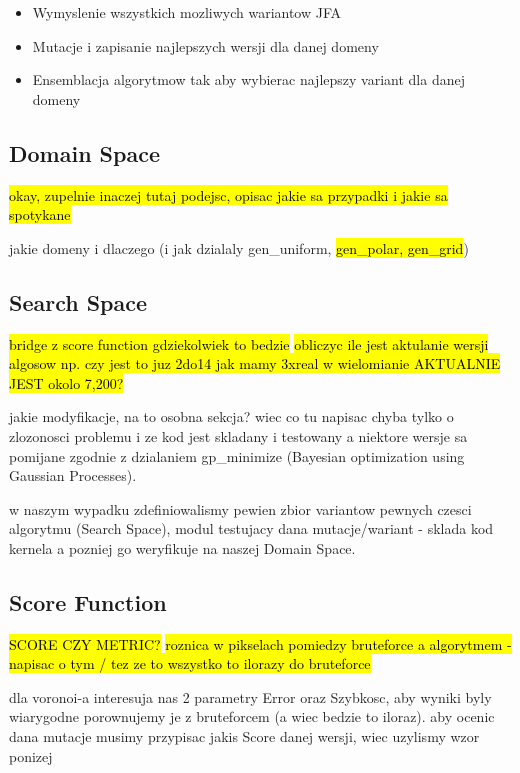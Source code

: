 \documentclass[format=acmsmall,screen,review,authordraft,nonacm]{acmart}
\begin{document}
\begin{itemize}
\item Wymyslenie wszystkich mozliwych wariantow JFA
\item Mutacje i zapisanie najlepszych wersji dla danej domeny
\item Ensemblacja algorytmow tak aby wybierac najlepszy variant dla danej domeny
\end{itemize}

\subsection{Domain Space} %

\hl{okay, zupelnie inaczej tutaj podejsc, opisac jakie sa przypadki i jakie sa
spotykane}

jakie domeny i dlaczego (i jak dzialaly gen\_uniform, \hl{gen\_polar, gen\_grid})

\subsection{Search Space} %

\hl{bridge z score function gdziekolwiek to bedzie}
\hl{obliczyc ile jest aktulanie wersji algosow np. czy jest to juz 2do14 jak
mamy 3xreal w wielomianie AKTUALNIE JEST okolo 7,200?}

jakie modyfikacje, na to osobna sekcja? wiec co tu napisac
chyba tylko o zlozonosci problemu i ze kod jest skladany i testowany a niektore
wersje sa pomijane zgodnie z dzialaniem gp\_minimize (Bayesian optimization
using Gaussian Processes).

w naszym wypadku zdefiniowalismy pewien zbior variantow pewnych czesci
algorytmu (Search Space), modul testujacy dana mutacje/wariant - sklada kod kernela a pozniej go weryfikuje na naszej Domain Space.

\subsection{Score Function} %

\hl{SCORE CZY METRIC?}
\hl{roznica w pikselach pomiedzy bruteforce a algorytmem - napisac o tym / tez
ze to wszystko to ilorazy do bruteforce}

dla voronoi-a interesuja nas 2 parametry Error oraz Szybkosc, aby wyniki byly
wiarygodne porownujemy je z bruteforcem (a wiec bedzie to iloraz).
aby ocenic dana mutacje musimy przypisac jakis Score danej wersji, wiec uzylismy
wzor ponizej
\end{document}
